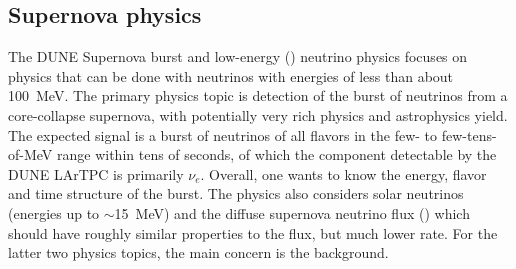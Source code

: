 


\subsection{Supernova physics }
\label{sec:sn}

The DUNE Supernova burst and low-energy () neutrino physics focuses on physics that can be done with neutrinos with energies of less than about \SI{100}{\MeV}. The primary physics topic is detection of the burst of neutrinos from a core-collapse supernova, with potentially very rich physics and astrophysics yield. The expected signal is a burst of neutrinos of all flavors in the few- to few-tens-of-\si{\MeV} range within tens of seconds, of which the component detectable by the DUNE LArTPC is primarily $\nu_e$. Overall, one wants to know the energy, flavor and time structure of the burst. The  physics also considers solar neutrinos (energies up to $\sim$\SI{15}{\MeV}) and the diffuse supernova neutrino flux () which should have roughly similar properties to the  flux, but much lower rate. For the latter two physics topics, the main concern is the background. 

